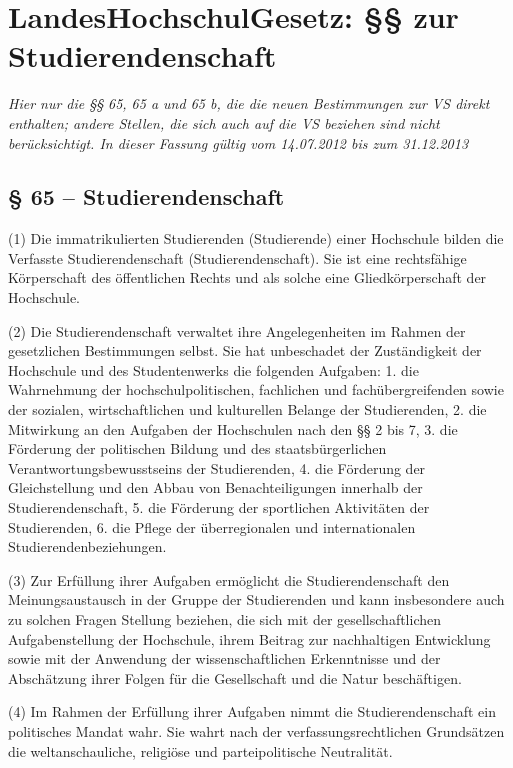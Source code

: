 \documentclass[
10pt,
a4paper,
twoside,								%
titlepage=false,							%
draft=false								%
]{scrartcl}
\begin{document}
\newpage
\section{LandesHochschulGesetz: §§ zur Studierendenschaft}

\emph{Hier nur die §§ 65, 65 a und 65 b, die die neuen Bestimmungen zur VS direkt enthalten; andere Stellen, die sich auch auf die VS beziehen sind nicht berücksichtigt. In dieser Fassung gültig vom 14.07.2012 bis zum 31.12.2013}

\subsection{§ 65 – Studierendenschaft}

(1) Die immatrikulierten Studierenden (Studierende) einer Hochschule bilden die Verfasste Studierendenschaft (Studierendenschaft). Sie ist eine rechtsfähige Körperschaft des öffentlichen Rechts und als solche eine Gliedkörperschaft der Hochschule.

(2) Die Studierendenschaft verwaltet ihre Angelegenheiten im Rahmen der gesetzlichen Bestimmungen selbst. Sie hat unbeschadet der Zuständigkeit der Hochschule und des Studentenwerks die folgenden Aufgaben:
1. die Wahrnehmung der hochschulpolitischen, fachlichen und fachübergreifenden sowie der sozialen, wirtschaftlichen und kulturellen Belange der Studierenden,
2. die Mitwirkung an den Aufgaben der Hochschulen nach den §§ 2 bis 7,
3. die Förderung der politischen Bildung und des staatsbürgerlichen Verantwortungsbewusstseins der Studierenden,
4. die Förderung der Gleichstellung und den Abbau von Benachteiligungen innerhalb der Studierendenschaft,
5. die Förderung der sportlichen Aktivitäten der Studierenden,
6. die Pflege der überregionalen und internationalen Studierendenbeziehungen.

(3) Zur Erfüllung ihrer Aufgaben ermöglicht die Studierendenschaft den Meinungsaustausch in der Gruppe der Studierenden und kann insbesondere auch zu solchen Fragen Stellung beziehen, die sich mit der gesellschaftlichen Aufgabenstellung der Hochschule, ihrem Beitrag zur nachhaltigen Entwicklung sowie mit der Anwendung der wissenschaftlichen Erkenntnisse und der Abschätzung ihrer Folgen für die Gesellschaft und die Natur beschäftigen.

(4) Im Rahmen der Erfüllung ihrer Aufgaben nimmt die Studierendenschaft ein politisches Mandat wahr. Sie wahrt nach der verfassungsrechtlichen Grundsätzen die weltanschauliche, religiöse und parteipolitische Neutralität.
\end{document}
